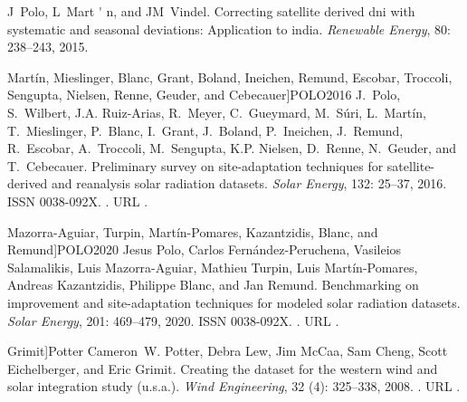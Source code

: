 \documentclass[letterpaper,12pt, twoside]{report}
\providecommand{\DIFdeltex}[1]{{\protect\color{red} \scriptsize #1}} %
\providecommand{\DIFdel}[1]{\texorpdfstring{\DIFdeltex{#1}}{}} %
\begin{document}
\DIFdel{J~Polo, L~Mart}%
\DIFdel{\'}%
\DIFdel{n, and JM~Vindel.
}%
\DIFdel{Correcting satellite derived dni with systematic and seasonal
  deviations: Application to india.
}%
\DIFdel{\emph{Renewable Energy}, 80:}%
\DIFdel{238--243, 2015.
}%

  Martín, Mieslinger, Blanc, Grant, Boland, Ineichen, Remund, Escobar,
  Troccoli, Sengupta, Nielsen, Renne, Geuder, and Cebecauer]{POLO2016}
\DIFdel{J.~Polo, S.~Wilbert, J.A. Ruiz-Arias, R.~Meyer, C.~Gueymard, M.~Súri,
  L.~Martín, T.~Mieslinger, P.~Blanc, I.~Grant, J.~Boland, P.~Ineichen,
  J.~Remund, R.~Escobar, A.~Troccoli, M.~Sengupta, K.P. Nielsen, D.~Renne,
  N.~Geuder, and T.~Cebecauer.
}%
\DIFdel{Preliminary survey on site-adaptation techniques for
  satellite-derived and reanalysis solar radiation datasets.
}%
\DIFdel{\emph{Solar Energy}, 132:}%
\DIFdel{25--37, 2016.
}%
\DIFdel{ISSN 0038-092X.
}%
\DIFdel{.
}%
\DIFdel{URL
  }%
\DIFdel{.
}%

  Mazorra-Aguiar, Turpin, Martín-Pomares, Kazantzidis, Blanc, and
  Remund]{POLO2020}
\DIFdel{Jesus Polo, Carlos Fernández-Peruchena, Vasileios Salamalikis, Luis
  Mazorra-Aguiar, Mathieu Turpin, Luis Martín-Pomares, Andreas Kazantzidis,
  Philippe Blanc, and Jan Remund.
}%
\DIFdel{Benchmarking on improvement and site-adaptation techniques for
  modeled solar radiation datasets.
}%
\DIFdel{\emph{Solar Energy}, 201:}%
\DIFdel{469--479, 2020.
}%
\DIFdel{ISSN 0038-092X.
}%
\DIFdel{.
}%
\DIFdel{URL
  }%
\DIFdel{.
}%

  Grimit]{Potter}
\DIFdel{Cameron~W. Potter, Debra Lew, Jim McCaa, Sam Cheng, Scott Eichelberger, and
  Eric Grimit.
}%
\DIFdel{Creating the dataset for the western wind and solar integration study
  (u.s.a.).
}%
\DIFdel{\emph{Wind Engineering}, 32}%
\DIFdel{(4):}%
\DIFdel{325--338, 2008.
}%
\DIFdel{.
}%
\DIFdel{URL }%
\DIFdel{.
}%
\end{document}
